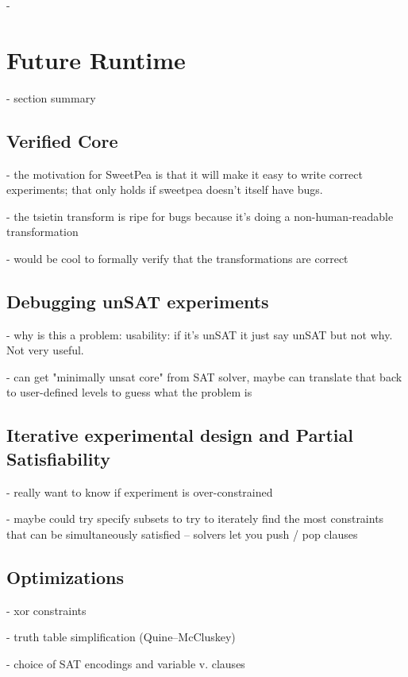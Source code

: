 -

\section{Future Runtime}

- section summary

\subsection{Verified Core}

- the motivation for SweetPea is that it will make it easy to write correct experiments; that only holds if sweetpea doesn't itself have bugs.

- the tsietin transform is ripe for bugs because it's doing a non-human-readable transformation

- would be cool to formally verify that the transformations are correct


\subsection{Debugging unSAT experiments}

- why is this a problem: usability: if it's unSAT it just say unSAT but not why. Not very useful.

- can get "minimally unsat core" from SAT solver, maybe can translate that back to user-defined levels to guess what the problem is

\subsection{Iterative experimental design and Partial Satisfiability}

- really want to know if experiment is over-constrained

- maybe could try specify subsets to try to iterately find the most constraints that can be simultaneously satisfied -- solvers let you push / pop clauses

\subsection{Optimizations}

- xor constraints

- truth table simplification (Quine–McCluskey)

- choice of SAT encodings and variable v. clauses
